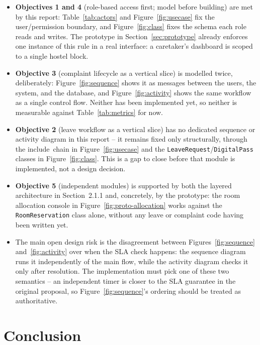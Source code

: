 \documentclass{tietreport}
\begin{document}
\begin{itemize}
  \item \textbf{Objectives 1 and 4} (role-based access first; model
    before building) are met by this report: Table~\ref{tab:actors} and
    Figure~\ref{fig:usecase} fix the user/permission boundary, and
    Figure~\ref{fig:class} fixes the schema each role reads and writes.
    The prototype in Section~\ref{sec:prototype} already enforces one
    instance of this rule in a real interface: a caretaker's dashboard
    is scoped to a single hostel block.
  \item \textbf{Objective 3} (complaint lifecycle as a vertical slice)
    is modelled twice, deliberately: Figure~\ref{fig:sequence} shows it
    as messages between the users, the system, and the database, and
    Figure~\ref{fig:activity} shows the same workflow as a single
    control flow. Neither has been implemented yet, so neither is
    measurable against Table~\ref{tab:metrics} for now.
  \item \textbf{Objective 2} (leave workflow as a vertical slice) has no
    dedicated sequence or activity diagram in this report -- it remains
    fixed only structurally, through the \guillemotleft
    include\guillemotright\ chain in Figure~\ref{fig:usecase} and the
    \texttt{LeaveRequest}/\texttt{DigitalPass} classes in
    Figure~\ref{fig:class}. This is a gap to close before that module is
    implemented, not a design decision.
  \item \textbf{Objective 5} (independent modules) is supported by both
    the layered architecture in Section~2.1.1 and, concretely, by the
    prototype: the room allocation console in
    Figure~\ref{fig:proto-allocation} works against the
    \texttt{RoomReservation} class alone, without any leave or complaint
    code having been written yet.
  \item The main open design risk is the disagreement between
    Figures~\ref{fig:sequence} and~\ref{fig:activity} over when the SLA
    check happens: the sequence diagram runs it independently of the
    main flow, while the activity diagram checks it only after
    resolution. The implementation must pick one of these two semantics
    -- an independent timer is closer to the SLA guarantee in the
    original proposal, so Figure~\ref{fig:sequence}'s ordering should be
    treated as authoritative.
\end{itemize}

\chapter{Conclusion}
\end{document}

